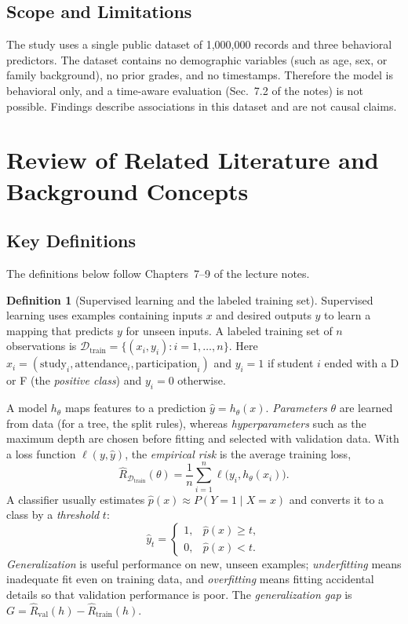 \documentclass[12pt,a4paper]{article}
\theoremstyle{definition}
\newtheorem{definition}{Definition}
\begin{document}
\subsection{Scope and Limitations}

The study uses a single public dataset of 1{,}000{,}000 records and three behavioral predictors. The dataset contains no demographic variables (such as age, sex, or family background), no prior grades, and no timestamps. Therefore the model is behavioral only, and a time-aware evaluation (Sec.~7.2 of the notes) is not possible. Findings describe associations in this dataset and are not causal claims.

\section{Review of Related Literature and Background Concepts}

\subsection{Key Definitions}

The definitions below follow Chapters~7--9 of the lecture notes.

\begin{definition}[Supervised learning and the labeled training set]
Supervised learning uses examples containing inputs $x$ and desired outputs $y$ to learn a mapping that predicts $y$ for unseen inputs. A labeled training set of $n$ observations is
$\mathcal{D}_{\mathrm{train}} = \{(x_i, y_i) : i = 1,\dots,n\}$. Here $x_i = (\text{study}_i, \text{attendance}_i, \text{participation}_i)$ and $y_i = 1$ if student $i$ ended with a D or F (the \emph{positive class}) and $y_i = 0$ otherwise.
\end{definition}

A model $h_\theta$ maps features to a prediction $\hat y = h_\theta(x)$. \emph{Parameters} $\theta$ are learned from data (for a tree, the split rules), whereas \emph{hyperparameters} such as the maximum depth are chosen before fitting and selected with validation data. With a loss function $\ell(y,\hat y)$, the \emph{empirical risk} is the average training loss,
\begin{equation}
    \hat R_{\mathcal{D}_{\mathrm{train}}}(\theta) = \frac{1}{n}\sum_{i=1}^{n} \ell\bigl(y_i, h_\theta(x_i)\bigr).
\end{equation}
A classifier usually estimates $\hat p(x) \approx P(Y=1 \mid X=x)$ and converts it to a class by a \emph{threshold} $t$:
\begin{equation}
    \hat y_t = \begin{cases} 1, & \hat p(x) \ge t,\\ 0, & \hat p(x) < t. \end{cases}
\end{equation}
\emph{Generalization} is useful performance on new, unseen examples; \emph{underfitting} means inadequate fit even on training data, and \emph{overfitting} means fitting accidental details so that validation performance is poor. The \emph{generalization gap} is $G = \hat R_{\mathrm{val}}(h) - \hat R_{\mathrm{train}}(h)$.
\end{document}
